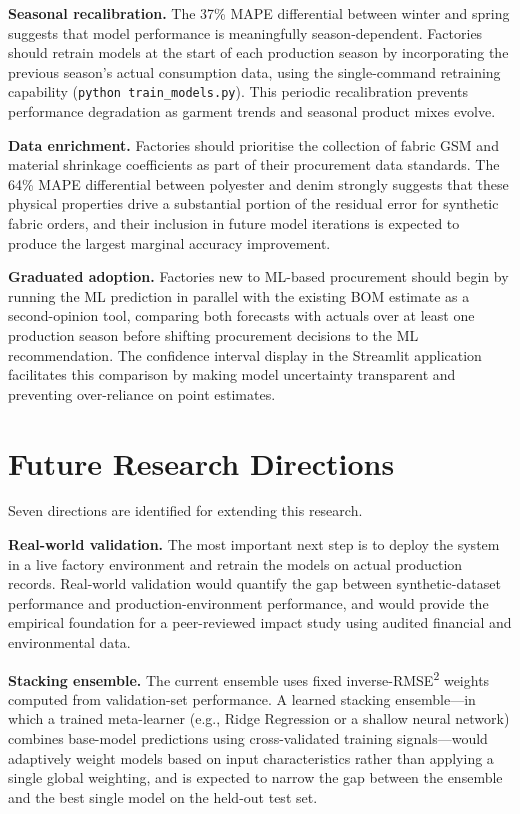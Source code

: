 \textbf{Seasonal recalibration.} The 37\% MAPE differential between winter and spring suggests that model performance is meaningfully season-dependent. Factories should retrain models at the start of each production season by incorporating the previous season's actual consumption data, using the single-command retraining capability (\texttt{python train\_models.py}). This periodic recalibration prevents performance degradation as garment trends and seasonal product mixes evolve.

\textbf{Data enrichment.} Factories should prioritise the collection of fabric GSM and material shrinkage coefficients as part of their procurement data standards. The 64\% MAPE differential between polyester and denim strongly suggests that these physical properties drive a substantial portion of the residual error for synthetic fabric orders, and their inclusion in future model iterations is expected to produce the largest marginal accuracy improvement.

\textbf{Graduated adoption.} Factories new to ML-based procurement should begin by running the ML prediction in parallel with the existing BOM estimate as a second-opinion tool, comparing both forecasts with actuals over at least one production season before shifting procurement decisions to the ML recommendation. The confidence interval display in the Streamlit application facilitates this comparison by making model uncertainty transparent and preventing over-reliance on point estimates.

\secdiv
\section{Future Research Directions}
Seven directions are identified for extending this research.

\textbf{Real-world validation.} The most important next step is to deploy the system in a live factory environment and retrain the models on actual production records. Real-world validation would quantify the gap between synthetic-dataset performance and production-environment performance, and would provide the empirical foundation for a peer-reviewed impact study using audited financial and environmental data.

\textbf{Stacking ensemble.} The current ensemble uses fixed inverse-RMSE\textsuperscript{2} weights computed from validation-set performance. A learned stacking ensemble---in which a trained meta-learner (e.g., Ridge Regression or a shallow neural network) combines base-model predictions using cross-validated training signals---would adaptively weight models based on input characteristics rather than applying a single global weighting, and is expected to narrow the gap between the ensemble and the best single model on the held-out test set.

